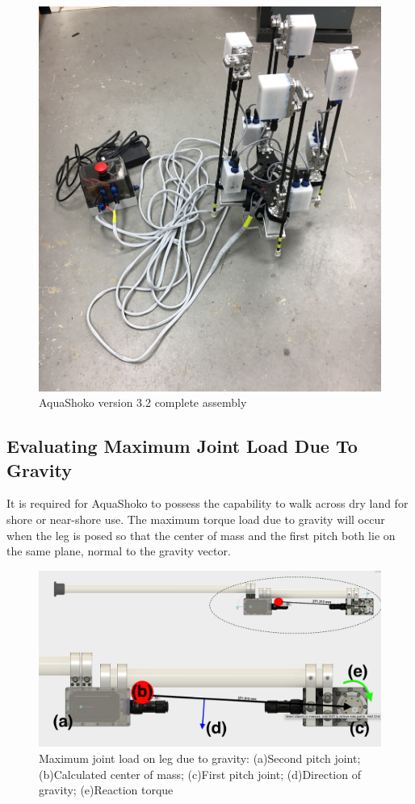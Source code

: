 \begin{figure}
\centering
\includegraphics[width=1.0\columnwidth]{./img/aquaShoko-v3dot2-photo-complete.JPG}
\caption{AquaShoko version 3.2 complete assembly }
\label{fig:shoko 3dot2}
\end{figure}

\subsection{Evaluating Maximum Joint Load Due To Gravity}
It is required for AquaShoko to possess the capability to walk across dry land for shore or near-shore use. The maximum torque load due to gravity will occur when the leg is posed so that the center of mass and the first pitch both lie on the same plane, normal to the gravity vector. 

\begin{figure}[h]
\centering
\includegraphics[width=1.0\columnwidth]{./img/aquaShoko-v3dot3-legCOM.png}
\caption{Maximum joint load on leg due to gravity: (a)Second pitch joint; (b)Calculated center of mass; (c)First pitch joint; (d)Direction of gravity; (e)Reaction torque}
\label{fig:shoko 3dot2}
\end{figure}


